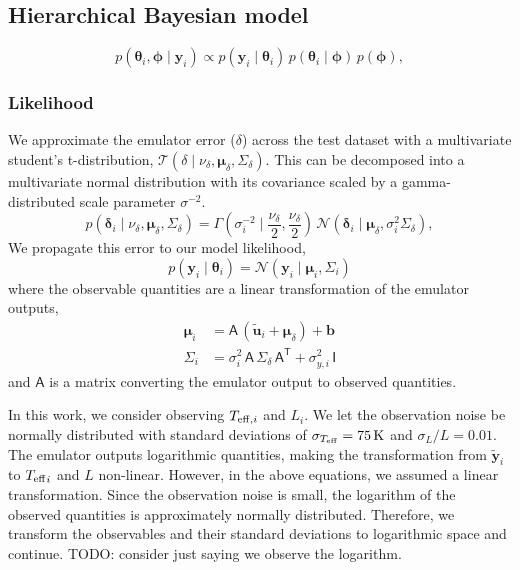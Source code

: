 \documentclass[fleqn,usenatbib]{mnras}
\newcommand{\normaldist}{\mathcal{N}}
\newcommand{\gammadist}{\Gamma}
\newcommand{\tdist}{\mathcal{T}}
\renewcommand*{\vec}[1]{\boldsymbol{#1}}
\newcommand*{\mat}[1]{\boldsymbol{\mathsf{#1}}}
\newcommand*{\transpose}{\mathsf{T}}
\newcommand{\obs}{{\vec{y}}}
\newcommand{\outputs}{{\vec{u}}}
\newcommand{\pred}{{\tilde{\outputs}}}
\newcommand{\error}{{\vec{\delta}}}
\newcommand{\teff}[1][]{{\ensuremath{T_{\mathrm{eff} \ifx#1\empty \else , #1 \fi}}}}
\begin{document}
\subsection{Hierarchical Bayesian model}
\label{sec:hbm}

%
\begin{equation}
    p(\vec \theta_i, \vec \phi \mid \obs_i) \propto p(\obs_i \mid \vec \theta_i) \, p(\vec\theta_i \mid \vec\phi) \, p(\vec\phi),
\end{equation}
%

\subsubsection{Likelihood}

We approximate the emulator error (\(\delta\)) across the test dataset with a multivariate student's t-distribution, \(\tdist(\delta \mid \nu_\delta, \vec\mu_\delta, \mat\Sigma_\delta)\). This can be decomposed into a multivariate normal distribution with its covariance scaled by a gamma-distributed scale parameter \(\sigma^{-2}\).
%
\begin{equation}
    p(\error_i \mid \nu_\delta, \vec\mu_\delta, \mat\Sigma_\delta) = \gammadist(\sigma_i^{-2} \mid \frac{\nu_\delta}{2}, \frac{\nu_\delta}{2}) \, \normaldist(\error_i \mid \vec\mu_\delta, \sigma_i^2 \mat\Sigma_\delta),
\end{equation}
%
We propagate this error to our model likelihood,
%
\begin{equation}
    p(\obs_i \mid \vec\theta_i) = \normaldist(\obs_i \mid \vec\mu_i, \mat\Sigma_i)
\end{equation}
%
where the observable quantities are a linear transformation of the emulator outputs,
%
\begin{align}
    \vec\mu_i &= \mat A \, (\pred_i + \vec\mu_\delta) + \vec b\\
    \mat\Sigma_i &= \sigma_i^2 \, \mat{A} \, \mat{\Sigma}_\delta \, \mat{A}^{\transpose} + \sigma_{y,i}^2 \, \mat{I} \label{eq:covariance}
\end{align}
%
and \(\mat A\) is a matrix converting the emulator output to observed quantities.

In this work, we consider observing \(\teff[i]\) and \(L_i\). We let the observation noise be normally distributed with standard deviations of \(\sigma_{\teff} = 75 \, \mathrm{K}\) and \(\sigma_L / L = 0.01\). The emulator outputs logarithmic quantities, making the transformation from \(\tilde{\vec y}_i\) to \(\teff_i\) and \(L\) non-linear. However, in the above equations, we assumed a linear transformation. Since the observation noise is small, the logarithm of the observed quantities is approximately normally distributed. Therefore, we transform the observables and their standard deviations to logarithmic space and continue. TODO: consider just saying we observe the logarithm.
\end{document}

